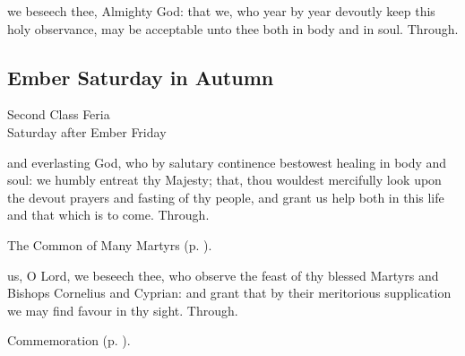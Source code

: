 
{} we beseech thee, Almighty God: that we, who year by year devoutly keep this holy observance, may be acceptable unto thee both in body and in soul. Through.


\subsection{Ember Saturday in Autumn}
\begin{inhead}
    {Second Class Feria\\
Saturday after Ember Friday}
\end{inhead}


{} and everlasting God, who by salutary continence bestowest healing in body and soul: we humbly entreat thy Majesty; that, thou wouldest mercifully look upon the devout prayers and fasting of thy people, and grant us help both in this life and that which is to come. Through.



\begin{rubric}
	The Common of Many Martyrs (p. \pageref{CommonMartyrs}).
\end{rubric}

{} us, O Lord, we beseech thee, who observe the feast of thy blessed Martyrs and Bishops Cornelius and Cyprian: and grant that by their meritorious supplication we may find favour in thy sight. Through.

\begin{rubric}
    Commemoration  (p. \pageref{EuphemiaCollect}).
\end{rubric}



